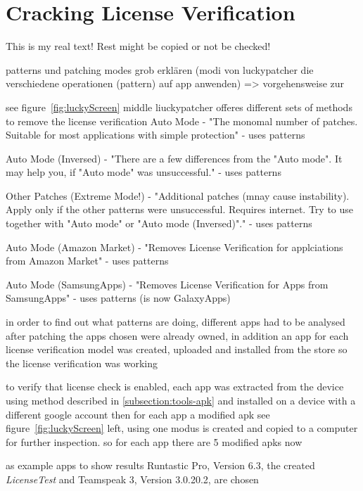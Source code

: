 \section{Cracking License Verification} \label{section:luckypatcher-modi}
This is my real text! Rest might be copied or not be checked!



%
patterns und patching modes grob erklären (modi von luckypatcher die verschiedene operationen (pattern) auf app anwenden) => vorgehensweise zur\newline

see figure~\ref{fig:luckyScreen} middle liuckypatcher offeres different sets of methods to remove the license verification
Auto Mode - "The monomal number of patches. Suitable for most applications with simple protection" - uses patterns

Auto Mode (Inversed) - "There are a few differences from the "Auto mode". It may help you, if "Auto mode" was unsuccessful." - uses patterns

Other Patches (Extreme Mode!) - "Additional patches (mnay cause instability). Apply only if the other patterns were unsuccessful. Requires internet. Try to use together with "Auto mode" or "Auto mode (Inversed)"." - uses patterns

Auto Mode (Amazon Market) - "Removes License Verification for applciations from Amazon Market" - uses patterns

Auto Mode (SamsungApps) - "Removes License Verification for Apps from SamsungApps" - uses patterns  (is now GalaxyApps)


in order to find out what patterns are doing, different apps had to be analysed after patching
the apps chosen were already owned, in addition an app for each license verification model was created, uploaded and installed from the store so the license verification was working

to verify that license check is enabled, each app was extracted from the device using method described in \ref{subsection:tools-apk} and installed on a device with a different google account
then for each app a modified apk see figure~\ref{fig:luckyScreen} left, using one modus is created and copied to a computer for further inspection. so for each app there are 5 modified apks now


as example apps to show results Runtastic Pro\cite{runtasticApp}, Version 6.3, the created \textit{LicenseTest} and Teamspeak 3\cite{teamspeakApp}, Version 3.0.20.2, are chosen

